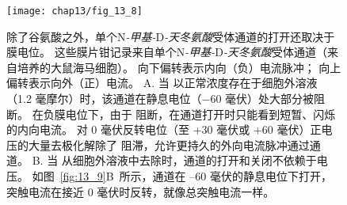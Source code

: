 \begin{figure}[htbp]
	\centering
	\texttt{[image: chap13/fig\_13\_8]}
	\caption{除了谷氨酸之外，单个N\textit{-甲基-}D\textit{-天冬氨酸}受体通道的打开还取决于膜电位。
		这些膜片钳记录来自单个N\textit{-甲基-}D\textit{-天冬氨酸}受体通道（来自培养的大鼠海马细胞）。
		向下偏转表示内向（负）电流脉冲；
		向上偏转表示向外（正）电流。
		A. 当  以正常浓度存在于细胞外溶液（1.2 毫摩尔）时，该通道在静息电位（−60 毫伏）处大部分被阻断。
		在负膜电位下，由于  阻断，在通道打开时只能看到短暂、闪烁的内向电流。
		对 0 毫伏反转电位（至 +30 毫伏或 +60 毫伏）正电压的大量去极化解除了  阻滞，允许更持久的外向电流脉冲通过通道。
		B. 当  从细胞外溶液中去除时，通道的打开和关闭不依赖于电压。
		如图~\ref{fig:13_9}B~所示，通道在 –60 毫伏的静息电位下打开，突触电流在接近 0 毫伏时反转，就像总突触电流一样。}
	\label{fig:13_8}
\end{figure}


